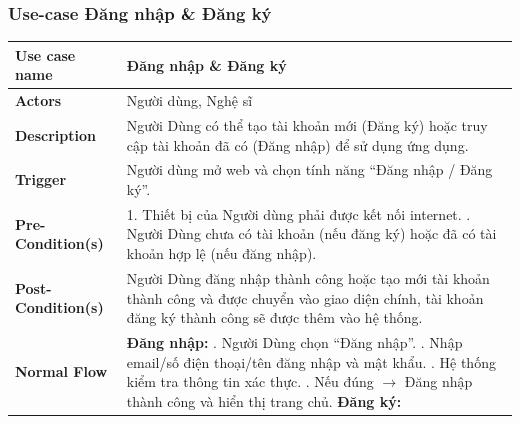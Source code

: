 \documentclass[a4paper]{article}
\begin{document}
\subsubsection{Use-case Đăng nhập \& Đăng ký}
\begin{table}[H]
	\centering
	\renewcommand{\arraystretch}{1.3} %
	\begin{tabularx}{\textwidth}{|l|X|}
		\hline
		\textbf{Use case name} & Đăng nhập \& Đăng ký                                                                                                                                          \\ \hline
		\textbf{Actors}        & Người dùng, Nghệ sĩ                                                                                                                                           \\ \hline
		\textbf{Description}   & Người Dùng có thể tạo tài khoản mới (Đăng ký) hoặc truy cập tài khoản đã có (Đăng nhập) để sử dụng ứng dụng.                                                  \\ \hline
		\textbf{Trigger}       & Người dùng mở web và chọn tính năng “Đăng nhập / Đăng ký”.                                                                                                    \\ \hline
		\textbf{Pre-Condition(s)}
		                       & 1. Thiết bị của Người dùng phải được kết nối internet. \newline
		2. Người Dùng chưa có tài khoản (nếu đăng ký) hoặc đã có tài khoản hợp lệ (nếu đăng nhập).                                                                                             \\ \hline
		\textbf{Post-Condition(s)}
		                       & Người Dùng đăng nhập thành công hoặc tạo mới tài khoản thành công và được chuyển vào giao diện chính, tài khoản đăng ký thành công sẽ được thêm vào hệ thống. \\ \hline
		\textbf{Normal Flow}
		                       & \textbf{Đăng nhập:} \newline
		1. Người Dùng chọn “Đăng nhập”. \newline
		2. Nhập email/số điện thoại/tên đăng nhập và mật khẩu. \newline
		3. Hệ thống kiểm tra thông tin xác thực. \newline
		4. Nếu đúng $\rightarrow$ Đăng nhập thành công và hiển thị trang chủ. \newline
		\textbf{Đăng ký:} \newline

\end{tabularx}
\end{table}
\end{document}
